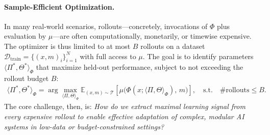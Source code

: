 
\paragraph{Sample-Efficient Optimization.}
In many real-world scenarios, rollouts---concretely, invocations of $\Phi$ plus evaluation by $\mu$---are often computationally, monetarily, or timewise expensive. The optimizer is thus limited to at most $B$ rollouts on a dataset $\mathcal{D}_\text{train} = \{ (x, m)_i \}_{i=1}^N$ with full access to $\mu$. The goal is to identify parameters $\langle \Pi^*, \Theta^* \rangle_\Phi$ that maximize held-out performance, subject to not exceeding the rollout budget $B$:
\begin{align}
    \langle \Pi^*, \Theta^* \rangle_\Phi = \arg\max_{\langle \Pi, \Theta \rangle_\Phi} \mathbb{E}_{(x, m) \sim \mathcal{T}} \left[ \mu\big( \Phi(x; \langle \Pi, \Theta \rangle_\Phi),\, m \big) \right], \quad \text{s.t.} \quad \#\text{rollouts} \leq B.
\end{align}
The core challenge, then, is: \emph{How do we extract maximal learning signal from every expensive rollout to enable effective adaptation of complex, modular AI systems in low-data or budget-constrained settings?}

